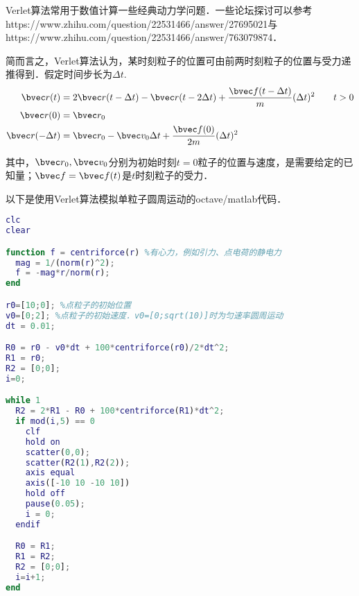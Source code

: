 

\begin{issues}
\issueNeedCite
\end{issues}

Verlet算法常用于数值计算一些经典动力学问题．一些论坛探讨可以参考https://www.zhihu.com/question/22531466/answer/27695021与https://www.zhihu.com/question/22531466/answer/763079874．

简而言之，Verlet算法认为，某时刻粒子的位置可由前两时刻粒子的位置与受力递推得到．假定时间步长为$\Delta t$.
\begin{equation}
\begin{aligned}
\bvec r (t) &= 2\bvec r(t-\Delta t) - \bvec r(t-2\Delta t) + \frac{\bvec f(t-\Delta t)}{m}(\Delta t)^2 \qquad t>0\\
\bvec r (0) &= \bvec r_0\\
\bvec r (- \Delta t) &= \bvec r_0 - \bvec v_0 \Delta t + \frac{\bvec f(0)}{2m}(\Delta t)^2\\
\end{aligned}
\end{equation}

其中，$\bvec r_0, \bvec v_0$分别为初始时刻$t=0$粒子的位置与速度，是需要给定的已知量；$\bvec f = \bvec f(t)$是$t$时刻粒子的受力．

以下是使用Verlet算法模拟单粒子圆周运动的octave/matlab代码．
\begin{lstlisting}[language=matlab]
clc
clear

function f = centriforce(r) %有心力，例如引力、点电荷的静电力
  mag = 1/(norm(r)^2);
  f = -mag*r/norm(r);
end

r0=[10;0]; %点粒子的初始位置
v0=[0;2]; %点粒子的初始速度．v0=[0;sqrt(10)]时为匀速率圆周运动
dt = 0.01;

R0 = r0 - v0*dt + 100*centriforce(r0)/2*dt^2;
R1 = r0;
R2 = [0;0];
i=0;

while 1
  R2 = 2*R1 - R0 + 100*centriforce(R1)*dt^2;
  if mod(i,5) == 0
    clf
    hold on
    scatter(0,0);
    scatter(R2(1),R2(2));
    axis equal
    axis([-10 10 -10 10])
    hold off
    pause(0.05);
    i = 0;
  endif

  R0 = R1;
  R1 = R2;
  R2 = [0;0];
  i=i+1;
end

\end{lstlisting}
